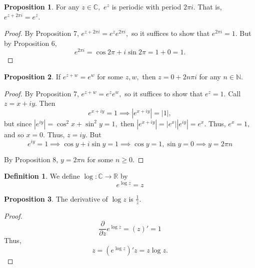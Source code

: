 \documentclass[10pt, oneside]{article}
\newcommand{\bbR}{\mathbb{R}}
\newcommand{\bbC}{\mathbb{C}}
\newcommand{\bbN}{\mathbb{N}}
\theoremstyle{definition}
\newtheorem{defn}{Definition}
\newtheorem{prop}{Proposition}
\begin{document}
\begin{prop}
    For any $z\in \bbC,$ $e^z$ is periodic with period $2\pi i.$ That is, $e^{z + 2\pi i}=  e^z.$
\end{prop}
\begin{proof}
    By Proposition 7, $e^{z + 2\pi i} = e^z e^{2\pi i},$ so it suffices to show that $e^{2\pi i}  = 1.$ But by Proposition 6,
    \[e^{2\pi i} = \cos {2\pi} + i\sin{2\pi} = 1 + 0 = 1.\]
\end{proof}

\begin{prop}
    If $e^{z + w} = e^w$ for some $z,w,$ then $z = 0 + 2n\pi i$ for any $n \in \bbN.$ 
\end{prop}
\begin{proof}
    By Proposition 7, $e^{z + w} = e^ze^w,$ so it suffices to show that $e^z  = 1.$ Call $z = x + i y.$ Then 
    \[e^{x+ iy} = 1 \implies |e^{x + iy}| = |1|,\] but since $|e^{iy}| = \cos^2 x + \sin^2 y =  1,$ then 
    $|e^{x + iy}| = |e^x||e^{iy}| = e^x.$ Thus, $e^x = 1,$ and so $x = 0.$ Thus, $z = iy.$ But 
    \[e^{iy} = 1 \implies \cos y + i\sin y = 1 \implies \cos y = 1, \sin y = 0 \implies y = 2\pi n\]
    
    By Proposition 8, $y = 2\pi n$ for some $n \geq 0.$ 
\end{proof}
\begin{defn}
    We define $\log: \bbC \to \bbR$ by 
    \[e^{\log z} = z\]
\end{defn}
\begin{prop}
    The derivative of $\log z$ is $\frac{1}{z}.$
\end{prop}
\begin{proof}
    \[\frac{\partial}{\partial z} e^{\log z} = (z)' = 1\] Thus, 
    \[z = (e^{\log z})' z = z\log z .\]
\end{proof}
\end{document}
